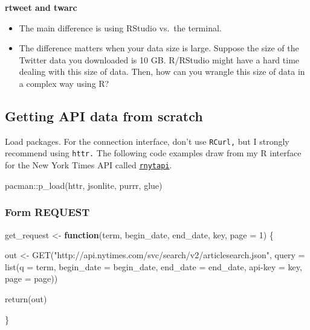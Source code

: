 \documentclass[
]{book}
\newenvironment{Shaded}{\begin{snugshade}}{\end{snugshade}}
\newcommand{\AttributeTok}[1]{\textcolor[rgb]{0.77,0.63,0.00}{#1}}
\newcommand{\ControlFlowTok}[1]{\textcolor[rgb]{0.13,0.29,0.53}{\textbf{#1}}}
\newcommand{\DecValTok}[1]{\textcolor[rgb]{0.00,0.00,0.81}{#1}}
\newcommand{\FunctionTok}[1]{\textcolor[rgb]{0.00,0.00,0.00}{#1}}
\newcommand{\NormalTok}[1]{#1}
\newcommand{\OtherTok}[1]{\textcolor[rgb]{0.56,0.35,0.01}{#1}}
\newcommand{\SpecialCharTok}[1]{\textcolor[rgb]{0.00,0.00,0.00}{#1}}
\newcommand{\StringTok}[1]{\textcolor[rgb]{0.31,0.60,0.02}{#1}}
\begin{document}
\textbf{rtweet and twarc}

\begin{itemize}
\item
  The main difference is using RStudio vs.~the terminal.
\item
  The difference matters when your data size is large. Suppose the size of the Twitter data you downloaded is 10 GB. R/RStudio might have a hard time dealing with this size of data. Then, how can you wrangle this size of data in a complex way using R?
\end{itemize}

\hypertarget{getting-api-data-from-scratch}{%
\subsection{Getting API data from scratch}\label{getting-api-data-from-scratch}}

Load packages. For the connection interface, don't use \texttt{RCurl,} but I strongly recommend using \texttt{httr.} The following code examples draw from my R interface for the New York Times API called \href{https://jaeyk.github.io/rnytapi/}{\texttt{rnytapi}}.

\begin{Shaded}
\begin{Highlighting}[]
\NormalTok{pacman}\SpecialCharTok{::}\FunctionTok{p\_load}\NormalTok{(httr, jsonlite, purrr, glue)}
\end{Highlighting}
\end{Shaded}

\hypertarget{form-request}{%
\subsubsection{Form REQUEST}\label{form-request}}

\begin{Shaded}
\begin{Highlighting}[]
\NormalTok{get\_request }\OtherTok{\textless{}{-}} \ControlFlowTok{function}\NormalTok{(term, begin\_date, end\_date, key, }\AttributeTok{page =} \DecValTok{1}\NormalTok{) \{}

\NormalTok{    out }\OtherTok{\textless{}{-}} \FunctionTok{GET}\NormalTok{(}\StringTok{"http://api.nytimes.com/svc/search/v2/articlesearch.json"}\NormalTok{,}
        \AttributeTok{query =} \FunctionTok{list}\NormalTok{(}\StringTok{\textquotesingle{}q\textquotesingle{}} \OtherTok{=}\NormalTok{ term,}
                     \StringTok{\textquotesingle{}begin\_date\textquotesingle{}} \OtherTok{=}\NormalTok{ begin\_date,}
                     \StringTok{\textquotesingle{}end\_date\textquotesingle{}} \OtherTok{=}\NormalTok{ end\_date,}
                     \StringTok{\textquotesingle{}api{-}key\textquotesingle{}} \OtherTok{=}\NormalTok{ key,}
                     \StringTok{\textquotesingle{}page\textquotesingle{}} \OtherTok{=}\NormalTok{ page))}

    \FunctionTok{return}\NormalTok{(out)}

\NormalTok{\}}
\end{Highlighting}
\end{Shaded}
\end{document}
